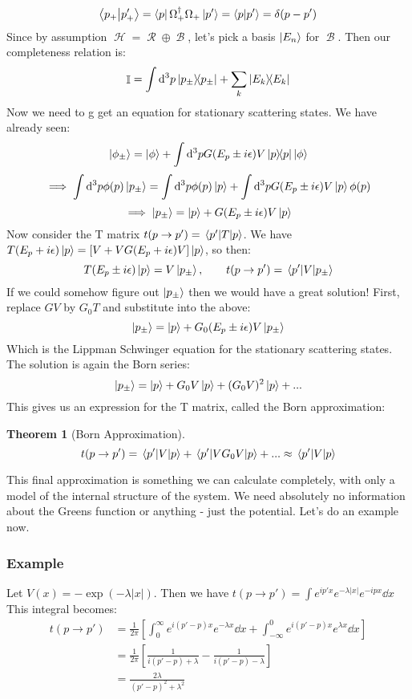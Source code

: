 \documentclass{article}
\DeclareMathOperator{\Bb}{\mathcal{B}}
\DeclareMathOperator{\Hh}{{\mathcal{H}}}
\DeclareMathOperator{\Rr}{{\mathcal{R}}}
\DeclareMathOperator{\II}{\mathbb{I}}
\newtheorem{thm}{Theorem}
\begin{document}
\[\braket{p_+}{p'_+} = \bra{p}\Omega^\dagger_+\Omega_+\ket{p'} = \braket{p}{p'} = \delta(p-p')\]
Since by assumption $\Hh = \Rr \oplus \Bb$, let's pick a basis $\ket{E_n}$ for $\Bb$. Then our completeness relation is:
\[\II = \int \dd^3 p \dyad{p_\pm} + \sum_k \dyad{E_k}\]
Now we need to g get an equation for stationary scattering states. We have already seen:
\[\ket{\phi_\pm} = \ket{\phi}+\int \dd^3 p G(E_p\pm i\epsilon) V\dyad{p}\ket{\phi}\]
\[\implies \int \dd^3 p \phi(p)\ket{p_\pm} = \int\dd^3 p \phi(p)\ket{p} + \int \dd^3 p G(E_p \pm i\epsilon)V\ket{p}\phi(p)\]
\[\implies \ket{p_\pm} = \ket{p} + G(E_p\pm i\epsilon) V\ket{p}\]
Now consider the T matrix $t(p\to p') = \mel{p'}{T}{p}$. We have $T(E_p+i\epsilon)\ket{p} = [V+VG(E_p+i\epsilon)V]\ket{p}$, so then:
\begin{equation}T(E_p\pm i\epsilon) \ket{p} = V\ket{p_\pm},\qquad t(p\to p') = \mel{p'}{V}{p_\pm}\end{equation}
If we could somehow figure out $\ket{p_\pm}$ then we would have a great solution! First, replace $GV$ by $G_0 T$ and substitute into the above:
\begin{equation}\ket{p_\pm} = \ket{p} + G_0(E_p\pm i\epsilon)V\ket{p_\pm}\end{equation}
Which is the Lippman Schwinger equation for the stationary scattering states. The solution is again the Born series:
\[\ket{p_\pm} = \ket{p} + G_0 V\ket{p} + (G_0 V)^2 \ket{p} + ...\]
This gives us an expression for the T matrix, called the Born approximation:
\begin{thm}[Born Approximation]
\begin{equation}t(p\to p') = \mel{p'}{V}{p}+\mel{p'}{V G_0 V}{p} + ... \approx \mel{p'}{V}{p}\end{equation}
\end{thm}
This final approximation is something we can calculate completely, with only a model of the internal structure of the system. We need absolutely no information about the Greens function or anything - just the potential. Let's do an example now.

\subsubsection*{Example}
Let $V(x) = -\exp(-\lambda |x|)$. Then we have $t(p\to p') = \int e^{ip'x}e^{-\lambda |x|}e^{-ipx}\dd x$ This integral becomes:
\begin{align*}t(p\to p')&=\frac{1}{2\pi}\left[\int_0^\infty e^{i(p'-p)x} e^{-\lambda x}\dd x + \int_{-\infty}^0 e^{i(p'-p)x}e^{\lambda x} \dd x\right]\\
&= \frac{1}{2\pi}\left[\frac{1}{i(p'-p)+\lambda}-\frac{1}{i(p'-p)-\lambda}\right]\\
&= \frac{2\lambda}{(p'-p)^2+\lambda^2}\end{align*}
\end{document}
